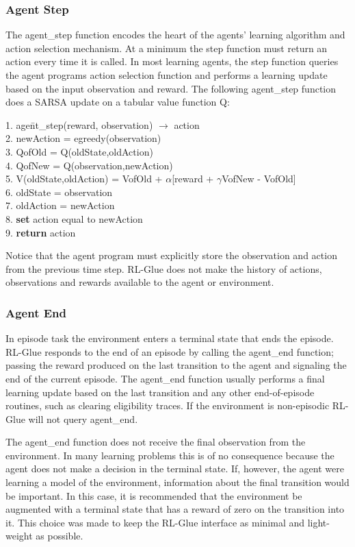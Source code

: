 \documentclass[11pt]{article}
\begin{document}
\subsubsection{Agent Step}
The agent\_step function encodes the heart of the agents' learning algorithm and action selection mechanism. At a minimum the step function must return an action every time it is called. In most learning agents, the step function queries the agent programs action selection function and performs a learning update based on the input observation and reward. The following agent\_step function does a SARSA update on a tabular value function Q:
\begin{tabbing}
1. age\=nt\_step(reward, observation) $\rightarrow$ action\\
2. \>newAction = egreedy(observation)\\
3. \> QofOld = Q(oldState,oldAction)\\
4. \> QofNew = Q(observation,newAction) \\
5. \> V(oldState,oldAction) = VofOld + $\alpha$[reward + $\gamma$VofNew - VofOld]\\
6. \> oldState = observation\\
7.\> oldAction = newAction\\
8. \> {\bf set} action equal to newAction\\
9. {\bf return} action
\end{tabbing}  
Notice that the agent program must explicitly store the observation and action from the previous time step. RL-Glue does not make the history of actions, observations and rewards available to the agent or environment.

\subsubsection{Agent End}
In episode task the environment enters a terminal state that ends the episode. RL-Glue responds to the end of an episode by calling the agent\_end function; passing the reward produced on the last transition to the agent and signaling the end of the current episode. The agent\_end function usually performs a final learning update based on the last transition and any other end-of-episode routines, such as clearing eligibility traces. If the environment is non-episodic RL-Glue will not query agent\_end.

The agent\_end function does not receive the final observation from the environment. In many learning problems this is of no consequence because the agent does not make a decision in the terminal state. If, however, the agent were learning a model of the environment, information about the final transition would be important. In this case, it is recommended that the environment be augmented with a terminal state that has a reward of zero on the transition into it. This choice was made to keep the RL-Glue interface as minimal and light-weight as possible. 
\end{document}
